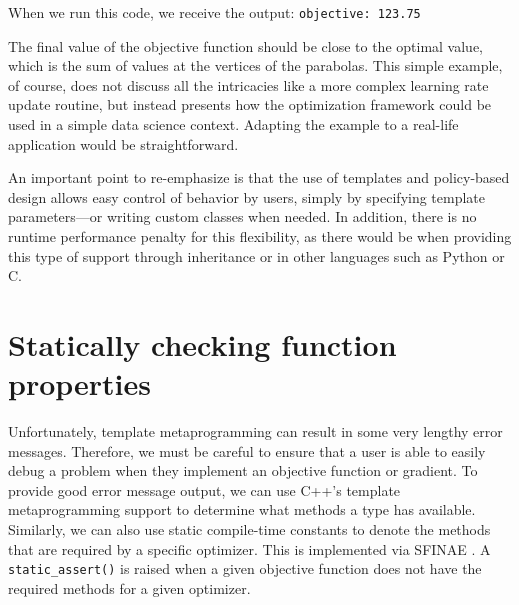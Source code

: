 \documentclass{article}
\begin{document}
When we run this code, we receive the output: {\tt objective: 123.75 }

The final value of the objective function should be close to the optimal value,
which is the sum of values at the vertices of the parabolas.
This simple example, of course, does not discuss all the intricacies like a more
complex learning rate update routine, but instead presents how the optimization
framework could be used in a simple data science context. Adapting the example
to a real-life application would be straightforward.

An important point to re-emphasize is that the use of templates and
policy-based design allows easy control of behavior by users, simply by
specifying template parameters---or writing custom classes when needed.  In
addition, there is no runtime performance penalty for this flexibility, as
there would be when providing this type of support through inheritance or in
other languages such as Python or C.


\vspace*{-0.4em}
\section{Statically checking function properties}
\label{sec:static}
\vspace*{-0.3em}

Unfortunately, template metaprogramming can result in some very lengthy error
messages.  Therefore, we must be careful to ensure that a user is able to easily
debug a problem when they implement an objective function or gradient.  To
provide good error message output, we can use C++'s template metaprogramming
support to determine what methods a type has available.  Similarly, we can also
use static compile-time constants to denote the methods that are required by a
specific optimizer.  This is implemented via SFINAE
\cite{Vandevoorde2002sfinae}.  A {\tt static\_assert()} is raised when a given
objective function does not have the required methods for a given optimizer.
\end{document}
